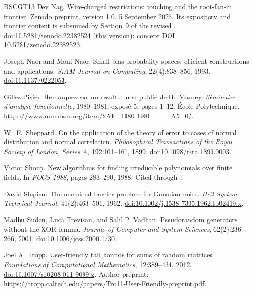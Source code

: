 \documentclass[11pt,letterpaper]{article}
\theoremstyle{definition}
\theoremstyle{remark}
\begin{document}
\begin{thebibliography}{BSCGT13}
Dev Nag.
\newblock Wire-charged restrictions: touching and the root-fan-in frontier.
\newblock Zenodo preprint, version 1.0, 5 September 2026. Its
expository and frontier content is subsumed by Section~9 of the
revised \cite{NagCubic}.
\newblock \href{https://doi.org/10.5281/zenodo.22382524}{doi:10.5281/zenodo.22382524}
(this version); concept DOI
\href{https://doi.org/10.5281/zenodo.22382523}{10.5281/zenodo.22382523}.

Joseph Naor and Moni Naor.
\newblock Small-bias probability spaces: efficient constructions and
  applications.
\newblock \emph{SIAM Journal on Computing}, 22(4):838--856, 1993.
\newblock \href{https://doi.org/10.1137/0222053}{doi:10.1137/0222053}.

Gilles Pisier.
\newblock Remarques sur un r\'esultat non publi\'e de B.~Maurey.
\newblock \emph{S\'eminaire d'analyse fonctionnelle}, 1980--1981,
  expos\'e 5, pages 1--12. \'Ecole Polytechnique.
\newblock \url{https://www.numdam.org/item/SAF_1980-1981____A5_0/}.

W.~F.~Sheppard.
\newblock On the application of the theory of error to cases of normal
  distribution and normal correlation.
\newblock \emph{Philosophical Transactions of the Royal Society of London,
  Series A}, 192:101--167, 1899.
\newblock \href{https://doi.org/10.1098/rsta.1899.0003}{doi:10.1098/rsta.1899.0003}.

Victor Shoup.
\newblock New algorithms for finding irreducible polynomials over
  finite fields.
\newblock In \emph{FOCS 1988}, pages 283--290, 1988.
Cited through~\cite[Algorithm~17]{BCGT13}.

David Slepian.
\newblock The one-sided barrier problem for Gaussian noise.
\newblock \emph{Bell System Technical Journal}, 41(2):463--501, 1962.
\newblock \href{https://doi.org/10.1002/j.1538-7305.1962.tb02419.x}{doi:10.1002/j.1538-7305.1962.tb02419.x}.

Madhu Sudan, Luca Trevisan, and Salil P. Vadhan.
\newblock Pseudorandom generators without the XOR lemma.
\newblock \emph{Journal of Computer and System Sciences}, 62(2):236--266, 2001.
\newblock \href{https://doi.org/10.1006/jcss.2000.1730}{doi:10.1006/jcss.2000.1730}.

Joel A. Tropp.
\newblock User-friendly tail bounds for sums of random matrices.
\newblock \emph{Foundations of Computational Mathematics}, 12:389--434, 2012.
\newblock \href{https://doi.org/10.1007/s10208-011-9099-z}{doi:10.1007/s10208-011-9099-z}.
Author preprint: \url{https://tropp.caltech.edu/papers/Tro11-User-Friendly-preprint.pdf}.


\end{thebibliography}
\end{document}
